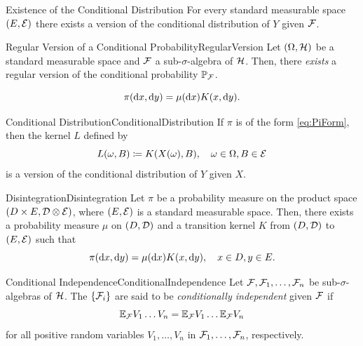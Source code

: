 \begin{thm}{Existence of the Conditional Distribution}{}
For every standard measurable space \((E, \mathcal{E})\) there exists a version of the conditional distribution of \(Y\) given \(\mathcal{F}\).
\end{thm}

\begin{thm}{Regular Version of a Conditional Probability}{RegularVersion}
    Let \((\Omega, \mathcal{H})\) be a standard measurable space and \(\mathcal{F}\) a sub-\(\sigma\)-algebra of \(\mathcal{H}\). Then, there \emph{exists} a regular version of the conditional probability \(\mathbb{P}_{\mathcal{F}}\).
\end{thm}

\begin{equation}\label{eq:PiForm}
    \pi(\mathrm{d} x, \mathrm{d} y) = \mu(\mathrm{d} x)K(x, \mathrm{d} y).
\end{equation}

\begin{thm}{Conditional Distribution}{ConditionalDistribution}
    If \(\pi\) is of the form \cref{eq:PiForm}, then the kernel \(L\) defined by
    \begin{equation}\label{eq:KernelDefinition}
        L(\omega, B) \coloneqq K(X(\omega), B), \quad \omega \in \Omega, B \in \mathcal{E}
    \end{equation}
    is a version of the conditional distribution of \(Y\) given \(X\).
\end{thm}

\begin{thm}{Disintegration}{Disintegration}
    Let \(\pi\) be a probability measure on the product space \((D \times E, \mathcal{D} \otimes \mathcal{E})\), where \((E, \mathcal{E})\) is a standard measurable space. Then, there exists a probability measure \(\mu\) on \((D, \mathcal{D})\) and a transition kernel \(K\) from \((D, \mathcal{D})\) to \((E, \mathcal{E})\) such that
    \begin{equation}\label{eq:DisintegrationFormula}
        \pi(\mathrm{d} x, \mathrm{d} y) = \mu(\mathrm{d} x) K(x, \mathrm{d} y), \quad x \in D, y \in E.
    \end{equation}
\end{thm}

\begin{defn}{Conditional Independence}{ConditionalIndependence}
    Let \(\mathcal{F}, \mathcal{F}_1, \dots, \mathcal{F}_n\) be sub-\(\sigma\)-algebras of \(\mathcal{H}\). The \(\{\mathcal{F}_i\}\) are said to be \emph{conditionally independent} given \(\mathcal{F}\) if
    \begin{equation}\label{eq:ConditionalIndependenceDef}
        \mathbb{E}_{\mathcal{F}} V_1 \dots V_n = \mathbb{E}_{\mathcal{F}} V_1 \dots \mathbb{E}_{\mathcal{F}} V_n
    \end{equation}
    for all positive random variables \(V_1, \dots, V_n\) in \(\mathcal{F}_1, \dots, \mathcal{F}_n\), respectively.
\end{defn}

